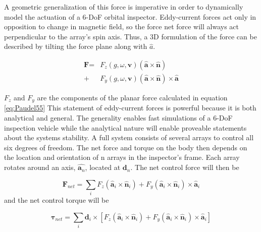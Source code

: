 \documentclass[letterpaper, 10 pt, conference]{ieeeconf}  %
\begin{document}
A geometric generalization of this force is imperative in order to dynamically model the actuation of a 6-DoF orbital inspector. Eddy-current forces act only in opposition to change in magnetic field, so the force net force will always act perpendicular to the array's spin axis. Thus, a 3D formulation of the force can be described by tilting the force plane along with $\hat{a}$. 

\begin{equation}
\label{eq:arrayForce}
\begin{split}
\textbf{F} =  &F_z(g,\omega,\textbf{v}) \left(\hat{\textbf{a}} \times \hat{\textbf{n}} \right) \\
			 + &F_y(g,\omega,\textbf{v}) \left(\hat{\textbf{a}} \times \hat{\textbf{n}} \right) \times \hat{\textbf{a}}
 \end{split}
 \end{equation}
 
 $F_z$ and $F_y$ are the components of the planar force calculated in equation \ref{eq:Paudel55}
 This statement of eddy-current forces is powerful because it is both analytical and general. The generality enables fast simulations of a 6-DoF inspection vehicle while the analytical nature will enable proveable statements about the systems stability.
A full system consists of several arrays to control all six degrees of freedom. The net force and torque on the body then depends on the location and orientation of n arrays in the inspector's frame. Each array rotates around an axis, $\hat{\textbf{a}_n}$, located at $\textbf{d}_n$. The net control force will then be 
 
 \begin{equation}
 \label{eq:Fnet }
  \textbf{F}_{net} =  \sum_{i} F_z \left(\hat{\textbf{a}}_i \times \hat{\textbf{n}}_i \right) 
		+ F_y \left(\hat{\textbf{a}}_i \times \hat{\textbf{n}}_i \right) \times \hat{\textbf{a}}_i
 \end{equation}
 and the net control torque will be
 
 \begin{equation}
 \label{Tnet}
 \boldsymbol{\tau}_{net} =  \sum_{i} \textbf{d}_i \times [F_z \left(\hat{\textbf{a}}_i \times \hat{\textbf{n}}_i \right) 
		+ F_y \left(\hat{\textbf{a}}_i \times \hat{\textbf{n}}_i \right) \times \hat{\textbf{a}}_i]
 \end{equation}
\end{document}
